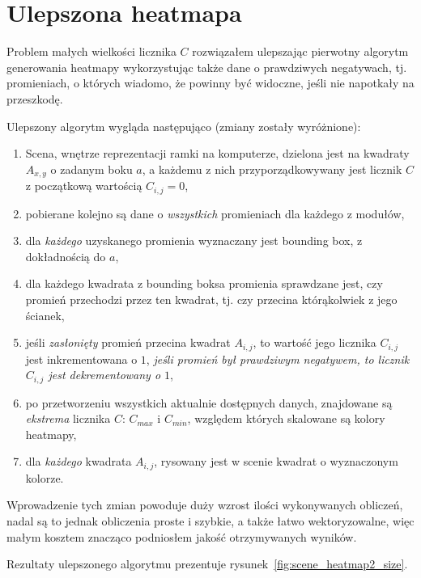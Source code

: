 \section{Ulepszona heatmapa}

Problem małych wielkości licznika $C$ rozwiązałem ulepszając pierwotny algorytm generowania heatmapy wykorzystując także dane o prawdziwych negatywach, tj. promieniach, o których wiadomo, że powinny być widoczne, jeśli nie napotkały na przeszkodę.

Ulepszony algorytm wygląda następująco (zmiany zostały wyróżnione):
\begin{enumerate}
 \item Scena, wnętrze reprezentacji ramki na komputerze, dzielona jest na kwadraty $A_{x,y}$ o zadanym boku $a$, a każdemu z nich przyporządkowywany jest licznik $C$ z początkową wartością $C_{i,j} = 0$,
 \item pobierane kolejno są dane o \textit{wszystkich} promieniach dla każdego z modułów,
 \item dla \textit{każdego} uzyskanego promienia wyznaczany jest bounding box, z dokładnością do $a$,
 \item dla każdego kwadrata z bounding boksa promienia sprawdzane jest, czy promień przechodzi przez ten kwadrat, tj. czy przecina którąkolwiek z jego ścianek,
 \item jeśli \textit{zasłonięty} promień przecina kwadrat $A_{i,j}$, to wartość jego licznika $C_{i,j}$ jest inkrementowana o $1$, \textit{jeśli promień był prawdziwym negatywem, to licznik $C_{i,j}$ jest dekrementowany o $1$},
 \item po przetworzeniu wszystkich aktualnie dostępnych danych, znajdowane są \textit{ekstrema} licznika $C$: $C_{max}$ i $C_{min}$, względem których skalowane są kolory heatmapy,
 \item dla \textit{każdego} kwadrata $A_{i,j}$, rysowany jest w scenie kwadrat o wyznaczonym kolorze.\\
\end{enumerate}

Wprowadzenie tych zmian powoduje duży wzrost ilości wykonywanych obliczeń, nadal są to jednak obliczenia proste i szybkie, a także łatwo wektoryzowalne, więc małym kosztem znacząco podniosłem jakość otrzymywanych wyników.

Rezultaty ulepszonego algorytmu prezentuje rysunek~\ref{fig:scene_heatmap2_size}.

